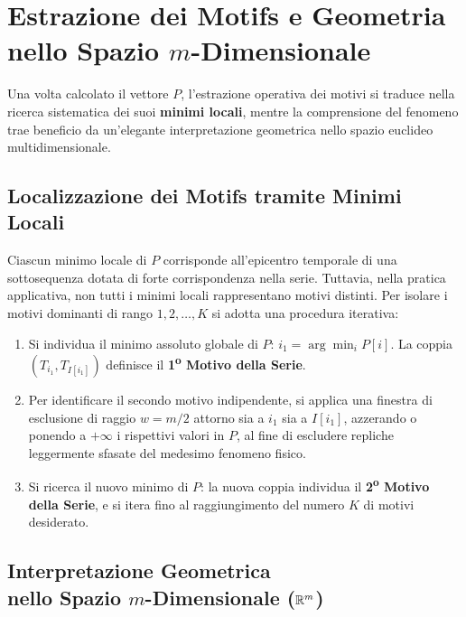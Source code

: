 \FloatBarrier
\section[Estrazione dei Motifs e Geometria nello Spazio m-Dimensionale]{Estrazione dei Motifs e Geometria nello Spazio $m$-Dimensionale}
\label{sec:ts-geometric-interpretation}

Una volta calcolato il vettore $P$, l'estrazione operativa dei motivi si traduce nella ricerca sistematica dei suoi \textbf{minimi locali}, mentre la comprensione del fenomeno trae beneficio da un'elegante interpretazione geometrica nello spazio euclideo multidimensionale.

\FloatBarrier
\subsection{Localizzazione dei Motifs tramite Minimi Locali}
\label{subsec:ts-motif-extraction-local-minima}

Ciascun minimo locale di $P$ corrisponde all'epicentro temporale di una sottosequenza dotata di forte corrispondenza nella serie. Tuttavia, nella pratica applicativa, non tutti i minimi locali rappresentano motivi distinti. Per isolare i motivi dominanti di rango $1, 2, \dots, K$ si adotta una procedura iterativa:
\begin{enumerate}
    \item Si individua il minimo assoluto globale di $P$: $i_1 = \arg\min_i P[i]$. La coppia $(T_{i_1}, T_{I[i_1]})$ definisce il \textbf{1\textsuperscript{o} Motivo della Serie}.
    \item Per identificare il secondo motivo indipendente, si applica una finestra di esclusione di raggio $w = m/2$ attorno sia a $i_1$ sia a $I[i_1]$, azzerando o ponendo a $+\infty$ i rispettivi valori in $P$, al fine di escludere repliche leggermente sfasate del medesimo fenomeno fisico.
    \item Si ricerca il nuovo minimo di $P$: la nuova coppia individua il \textbf{2\textsuperscript{o} Motivo della Serie}, e si itera fino al raggiungimento del numero $K$ di motivi desiderato.
\end{enumerate}

\FloatBarrier
\subsection[Interpretazione Geometrica nello Spazio $m$-Dimensionale]{Interpretazione Geometrica\\nello Spazio $m$-Dimensionale ($\mathbb{R}^m$)}
\label{subsec:ts-rm-geometry}

